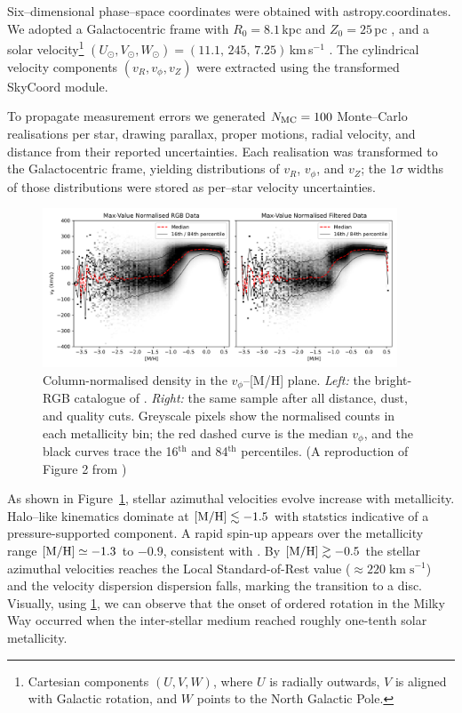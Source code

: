 \documentclass[a4paper,12pt]{article}
\begin{document}
Six–dimensional phase–space coordinates were obtained with
astropy.coordinates.  We adopted a Galactocentric frame
with $R_{0}=8.1$\,kpc and $Z_{0}=25$\,pc \citep{McMillan2016}, and a solar
velocity\footnote{Cartesian components $(U,V,W)$, where $U$ is radially
outwards, $V$ is aligned with Galactic rotation, and $W$ points to the
North Galactic Pole.}
$(U_{\odot},V_{\odot},W_{\odot})=(11.1,\,245,\,7.25)$\,km\,s$^{-1}$
\citep{Schonrich2010}.
The cylindrical velocity components
$(v_{R},v_{\phi},v_{Z})$ were extracted using the transformed
SkyCoord module.

To propagate measurement errors we generated
$N_{\rm MC}=100$ Monte–Carlo realisations per star, drawing
parallax, proper motions, radial velocity, and distance from their
reported uncertainties.  Each realisation was transformed to the
Galactocentric frame, yielding distributions of
$v_{R}$, $v_{\phi}$, and $v_{Z}$; the $1\sigma$ widths of those
distributions were stored as per–star velocity uncertainties.


\begin{figure}[H]
  \centering
  \includegraphics[width=0.94\textwidth]{../figures/vphi_histograms_with_tracks.png}
  \caption{Column-normalised density in the $v_{\phi}$–[M/H] plane.
           \textit{Left:} the bright-RGB catalogue of \citet{Andrae2023}.
           \textit{Right:} the same sample after all distance,
           dust, and quality cuts.  Greyscale pixels show the normalised
           counts in each metallicity bin; the red dashed curve is the
           median $v_{\phi}$, and the black curves trace the 16$^{\text{th}}$
           and 84$^{\text{th}}$ percentiles.
           (A reproduction of Figure 2 from \citet{zhang2024existencemetalpoordiscmilky})}
  \label{fig:vphi_tracks}
\end{figure}



As shown in Figure~\ref{fig:vphi_tracks}, stellar azimuthal velocities
evolve increase with metallicity.  Halo–like kinematics dominate at
${\rm [M/H]}\lesssim-1.5$ with statstics
indicative of a pressure-supported component.  A rapid spin-up appears over the 
metallicity range ${\rm [M/H]} \simeq -1.3$ to $-0.9$, consistent with \citet{Belokurov2022}.
By ${\rm [M/H]}\gtrsim-0.5$ the stellar azimuthal velocities reaches the Local
Standard-of-Rest value ($\approx220\;\mathrm{km\;s^{-1}}$) and the
velocity dispersion dispersion falls, marking the
transition to a disc.  Visually, using \ref{fig:vphi_tracks}, we can observe
that the onset of ordered rotation in the Milky Way occurred when the inter-stellar medium
reached roughly one-tenth solar metallicity.
\end{document}
